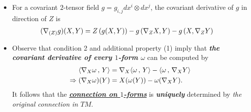 \documentclass[11pt]{article}
\begin{document}
\begin{itemize}
\item \begin{remark}
For a covariant $2$-tensor field $g= g_{i,j} dx^i \otimes dx^j$, the covariant derivative of $g$ in direction of $Z$ is
\begin{align*}
(\nabla_{(Z)}{g})(X, Y) &= Z\left(g(X, Y)\right) - g\left(\nabla_{Z}{X}, Y\right) - g\left(X, \nabla_{Z}{Y}\right)
\end{align*}
\end{remark}

\item \begin{remark}
Observe that condition 2 and additional property (1) imply that \emph{\textbf{the covariant derivative of every $1$-form $\omega$}} can be computed by
\begin{align} 
\left\langle \nabla_{X}{\omega}\,,\, Y \right\rangle &= \nabla_{X}{\left\langle \omega\,,\, Y \right\rangle} - \left\langle \omega\,,\, \nabla_{X}{Y} \right\rangle \nonumber\\
\Rightarrow (\nabla_{X}{\omega})(Y)&= X(\omega(Y)) - \omega(\nabla_{X}{Y}). \label{eqn: connections_1_form}
\end{align} It follows that the \underline{\emph{\textbf{connection on $1$-forms}}} is \emph{\textbf{uniquely}} determined by \emph{the original connection in $TM$}.
\end{remark}


\end{itemize}
\end{document}
